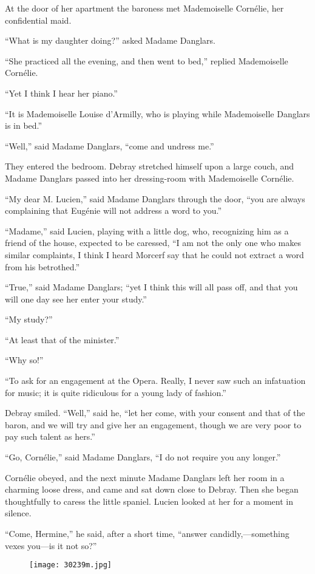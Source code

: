 At the door of her apartment the baroness met Mademoiselle Cornélie,
her confidential maid.

“What is my daughter doing?” asked Madame Danglars.

“She practiced all the evening, and then went to bed,” replied
Mademoiselle Cornélie.

“Yet I think I hear her piano.”

“It is Mademoiselle Louise d’Armilly, who is playing while Mademoiselle
Danglars is in bed.”

“Well,” said Madame Danglars, “come and undress me.”

They entered the bedroom. Debray stretched himself upon a large couch,
and Madame Danglars passed into her dressing-room with Mademoiselle
Cornélie.

“My dear M. Lucien,” said Madame Danglars through the door, “you are
always complaining that Eugénie will not address a word to you.”

“Madame,” said Lucien, playing with a little dog, who, recognizing him
as a friend of the house, expected to be caressed, “I am not the only
one who makes similar complaints, I think I heard Morcerf say that he
could not extract a word from his betrothed.”

“True,” said Madame Danglars; “yet I think this will all pass off, and
that you will one day see her enter your study.”

“My study?”

“At least that of the minister.”

“Why so!”

“To ask for an engagement at the Opera. Really, I never saw such an
infatuation for music; it is quite ridiculous for a young lady of
fashion.”

Debray smiled. “Well,” said he, “let her come, with your consent and
that of the baron, and we will try and give her an engagement, though
we are very poor to pay such talent as hers.”

“Go, Cornélie,” said Madame Danglars, “I do not require you any
longer.”

Cornélie obeyed, and the next minute Madame Danglars left her room in a
charming loose dress, and came and sat down close to Debray. Then she
began thoughtfully to caress the little spaniel. Lucien looked at her
for a moment in silence.

“Come, Hermine,” he said, after a short time, “answer
candidly,—something vexes you—is it not so?”

\begin{figure}[ht]
\texttt{[image: 30239m.jpg]}
\end{figure}

